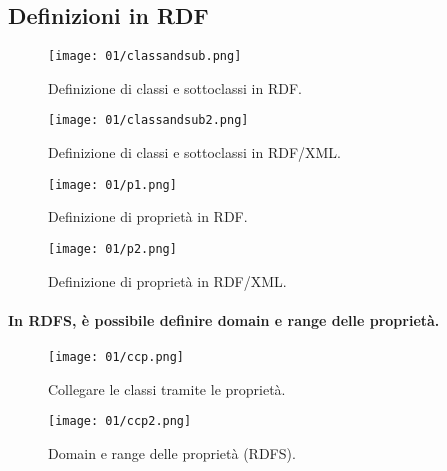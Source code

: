 \subsection{Definizioni in RDF}

\begin{figure}[h]
    \centering
    \begin{minipage}{0.48\textwidth}
        \centering
        \texttt{[image: 01/classandsub.png]}
        \caption{Definizione di classi e sottoclassi in RDF.}
    \end{minipage}
    \hfill
    \begin{minipage}{0.48\textwidth}
        \centering
        \texttt{[image: 01/classandsub2.png]}
        \caption{Definizione di classi e sottoclassi in RDF/XML.}
    \end{minipage}
\end{figure}

\begin{figure}[h]
    \centering
    \begin{minipage}{0.48\textwidth}
        \centering
        \texttt{[image: 01/p1.png]}
        \caption{Definizione di proprietà in RDF.}
    \end{minipage}
    \hfill
    \begin{minipage}{0.48\textwidth}
        \centering
        \texttt{[image: 01/p2.png]}
        \caption{Definizione di proprietà in RDF/XML.}
    \end{minipage}
\end{figure}


\paragraph{In RDFS, è possibile definire domain e range delle
proprietà.}


\begin{figure}[h]
    \centering
    \begin{minipage}{0.48\textwidth}
        \centering
        \texttt{[image: 01/ccp.png]}
        \caption{Collegare le classi tramite le
proprietà.}
    \end{minipage}
    \hfill
    \begin{minipage}{0.48\textwidth}
        \centering
        \texttt{[image: 01/ccp2.png]}
        \caption{Domain e range delle proprietà
(RDFS).}
    \end{minipage}
\end{figure}

